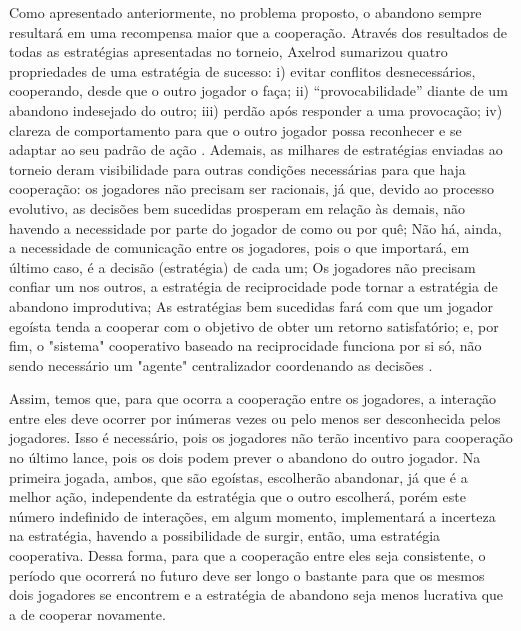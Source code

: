 Como apresentado anteriormente, no problema proposto, o abandono sempre resultará em uma recompensa maior que a cooperação. Através dos resultados de todas as estratégias apresentadas no torneio, Axelrod sumarizou quatro propriedades de uma estratégia de sucesso: i) evitar conflitos desnecessários, cooperando, desde que o outro jogador o faça; ii) \enquote{provocabilidade} diante de um abandono indesejado do outro; iii) perdão após responder a uma provocação; iv) clareza de comportamento para que o outro jogador possa reconhecer e se adaptar ao seu padrão de ação \cite[p.20]{Axelrod84}. Ademais, as milhares de estratégias enviadas ao torneio deram visibilidade para outras condições necessárias para que haja cooperação: os jogadores não precisam ser racionais, já que, devido ao processo evolutivo, as decisões bem sucedidas prosperam em relação às demais, não havendo a necessidade por parte do jogador de como ou por quê; Não há, ainda, a necessidade de comunicação entre os jogadores, pois o que importará, em último caso, é a decisão (estratégia) de cada um; Os jogadores não precisam confiar um nos outros, a estratégia de reciprocidade pode tornar a estratégia de abandono improdutiva; As estratégias bem sucedidas fará com que um jogador egoísta tenda a cooperar com o objetivo de obter um retorno satisfatório; e, por fim, o "sistema" cooperativo baseado na reciprocidade funciona por si só, não sendo necessário um "agente" centralizador coordenando as decisões \citep{Axelrod84}.

Assim, temos que, para que ocorra a cooperação entre os jogadores, a interação entre eles deve ocorrer por inúmeras vezes ou pelo menos ser desconhecida pelos jogadores. Isso é necessário, pois os jogadores não terão incentivo para cooperação no último lance, pois os dois podem prever o abandono do outro jogador. Na primeira jogada, ambos, que são egoístas, escolherão abandonar, já que é a melhor ação, independente da estratégia que o outro escolherá, porém este número indefinido de interações, em algum momento, implementará a incerteza na estratégia, havendo a possibilidade de surgir, então, uma estratégia cooperativa. Dessa forma, para que a cooperação entre eles seja consistente, o período que ocorrerá no futuro deve ser longo o bastante para que os mesmos dois jogadores se encontrem e a estratégia de abandono seja menos lucrativa que a de cooperar novamente.

